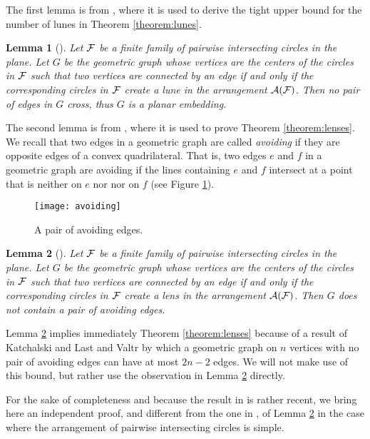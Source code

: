 \documentclass[11pt,a4paper]{article}
\newcommand{\F}{{\cal{F}}}
\newcommand{\A}{{\cal{A}}}
\newtheorem{lemma}{Lemma}
\begin{document}
The first lemma is from \cite{ALPS01}, where it is used to derive the tight upper bound for the number of lunes in Theorem \ref{theorem:lunes}.

\begin{lemma}[\cite{ALPS01}]\label{lemma:lunes}
Let $\F$ be a finite family of pairwise intersecting circles in the plane. Let
$G$ be the geometric graph whose vertices are the centers of the circles in $\F$
such that two vertices are connected by an edge if and only if the corresponding circles in $\F$
create a lune in the arrangement $\A(\F)$.
Then no pair of edges in $G$ cross, thus $G$ is a planar embedding.
\end{lemma}

The second lemma is from \cite{P24},
where it is used to prove Theorem \ref{theorem:lenses}.
We recall that two edges in a geometric graph are called \emph{avoiding} if they are opposite edges of a convex quadrilateral. That is, two edges $e$ and $f$ in a geometric graph are avoiding if the lines containing $e$ and $f$ intersect at a point that is neither on $e$ nor nor on $f$ (see Figure \ref{fig:avoiding}).

\begin{figure}[ht]
	\centering
	\texttt{[image: avoiding]}
	\caption{A pair of avoiding edges.}
	\label{fig:avoiding}
\end{figure}

\begin{lemma}[\cite{P24}]\label{lemma:lenses}
Let $\F$ be a finite family of pairwise intersecting circles in the plane. Let
$G$ be the geometric graph whose vertices are the centers of the circles in $\F$
such that two vertices are connected by an edge if and only if the corresponding circles in $\F$
create a lens in the arrangement $\A(\F)$.
Then $G$ does not contain a pair of avoiding edges.
\end{lemma}

Lemma \ref{lemma:lenses} implies immediately Theorem \ref{theorem:lenses}
because of a result of Katchalski and Last \cite{KL98} and Valtr \cite{V98} by which a geometric graph on $n$ vertices with no pair of avoiding edges
can have at most $2n-2$ edges. We will not make use of this bound, but rather use the observation in Lemma \ref{lemma:lenses} directly.

For the sake of completeness and because 
the result in \cite{P24} is rather recent, we bring here an independent proof, and different from the one in \cite{P24}, of Lemma \ref{lemma:lenses} in the case where 
the arrangement of pairwise intersecting circles is simple. 
\end{document}

